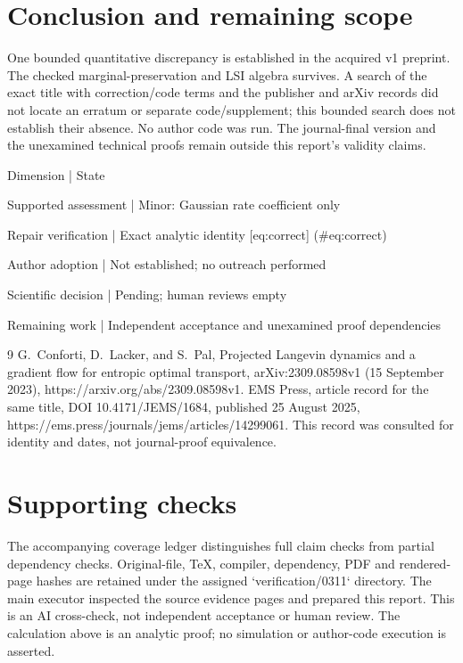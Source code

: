 \documentclass[10pt]{article}
\begin{document}
\section*{Conclusion and remaining scope}
One bounded quantitative discrepancy is established in the acquired v1 preprint. The checked marginal-preservation and LSI algebra survives. A search of the exact title with correction/code terms and the publisher and arXiv records did not locate an erratum or separate code/supplement; this bounded search does not establish their absence. No author code was run. The journal-final version and the unexamined technical proofs remain outside this report’s validity claims.\par
Dimension | State\par
Supported assessment | Minor: Gaussian rate coefficient only\par
Repair verification | Exact analytic identity [eq:correct] (\#eq:correct)\par
Author adoption | Not established; no outreach performed\par
Scientific decision | Pending; human reviews empty\par
Remaining work | Independent acceptance and unexamined proof dependencies\par
9 G. Conforti, D. Lacker, and S. Pal, Projected Langevin dynamics and a gradient flow for entropic optimal transport, arXiv:2309.08598v1 (15 September 2023), https://arxiv.org/abs/2309.08598v1. EMS Press, article record for the same title, DOI 10.4171/JEMS/1684, published 25 August 2025, https://ems.press/journals/jems/articles/14299061. This record was consulted for identity and dates, not journal-proof equivalence.\par
\section*{Supporting checks}
The accompanying coverage ledger distinguishes full claim checks from partial dependency checks. Original-file, TeX, compiler, dependency, PDF and rendered-page hashes are retained under the assigned `verification/0311` directory. The main executor inspected the source evidence pages and prepared this report. This is an AI cross-check, not independent acceptance or human review. The calculation above is an analytic proof; no simulation or author-code execution is asserted.\par
\end{document}
